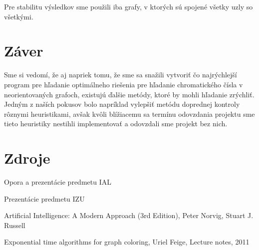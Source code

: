 \documentclass[a4paper,11pt]{article}
\begin{document}
\enspace
Pre stabilitu výsledkov sme použili iba grafy, v ktorých sú spojené všetky uzly so všetkými.
\enspace

\section{Záver}
Sme si vedomí, že aj napriek tomu, že sme sa snažili vytvoriť čo najrýchlejší program pre hľadanie optimálneho riešenia pre hľadanie chromatického čísla v neorientovaných grafoch, existujú ďalšie metódy, ktoré by mohli hľadanie zrýchliť. Jedným z naších pokusov bolo napríklad vylepšiť metódu doprednej kontroly rôznymi heuristikami, avšak kvôli blížiacemu sa termínu odovzdania projektu sme tieto heuristiky nestihli implementovať a odovzdali sme projekt bez nich.

\section{Zdroje}
\begin{compactitem}
\item Opora a prezentácie predmetu IAL
\item Prezentácie predmetu IZU
\item Artificial Intelligence: A Modern Approach (3rd Edition), Peter Norvig, Stuart J. Russell
\item Exponential time algorithms for graph coloring, Uriel Feige, Lecture notes, 2011
\end{compactitem}
\end{document}
